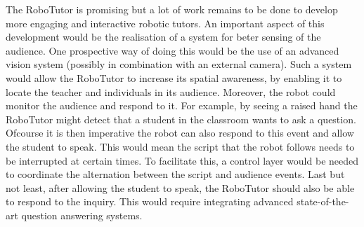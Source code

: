 The RoboTutor is promising but a lot of work remains to be done to develop more engaging and interactive robotic tutors. An important aspect of this development would be the realisation of a system for beter sensing of the audience. One prospective way of doing this would be the use of an advanced vision system (possibly in combination with an external camera). Such a system would allow the RoboTutor to increase its spatial awareness, by enabling it to locate the teacher and individuals in its audience. Moreover, the robot could monitor the audience and respond to it. For example, by seeing a raised hand the RoboTutor might detect that a student in the classroom wants to ask a question. Ofcourse it is then imperative the robot can also respond to this event and allow the student to speak. This would mean the script that the robot follows needs to be interrupted at certain times. To facilitate this, a control layer would be needed to coordinate the alternation between the script and audience events. Last but not least, after allowing the student to speak, the RoboTutor should also be able to respond to the inquiry. This would require integrating advanced state-of-the-art question answering systems.